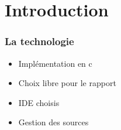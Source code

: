 \section{Introduction}

\begin{frame}
    \frametitle{\textbf{La technologie}}
	
	\begin{itemize}
	 \item Implémentation en c
	 \item Choix libre pour le rapport
	 \item IDE choisis
	 \item Gestion des sources
	\end{itemize}
\end{frame}
